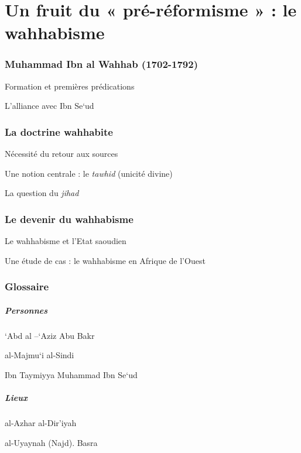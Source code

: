 \chapter{Un fruit du « pré-réformisme » : le wahhabisme}



 
  \subsection{Muhammad Ibn al Wahhab
  (1702-1792)} 
  \label{Theol:AlWahhab}
    Formation et premières prédications
 
    L'alliance avec Ibn Se`ud
    
 
  \subsection{La doctrine wahhabite} 

 
  Nécessité du retour aux sources
 
  Une notion centrale : le \emph{tawhid} (unicité divine)
  
  La question du \emph{jihad}
 
 
  \subsection{Le devenir du wahhabisme} 
 
    Le wahhabisme et l'Etat saoudien
  
    Une étude de cas : le wahhabisme en Afrique de l'Ouest
    

 
\subsection{ {Glossaire}} 


\paragraph{Personnes} `Abd al --`Aziz Abu Bakr

al-Majmu`i al-Sindi

Ibn Taymiyya Muhammad Ibn Se`ud

\paragraph{Lieux}

al-Azhar al-Dir'iyah

al-Uyaynah (Najd). Basra


